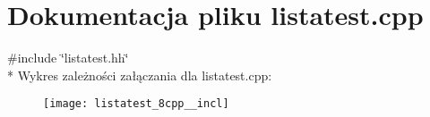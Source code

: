 \section{Dokumentacja pliku listatest.\+cpp}
\label{listatest_8cpp}
{\ttfamily \#include \char`\"{}listatest.\+hh\char`\"{}}\\*
Wykres zależności załączania dla listatest.\+cpp\+:\nopagebreak
\begin{figure}[H]
\begin{center}
\leavevmode
\texttt{[image: listatest\_8cpp\_\_incl]}
\end{center}
\end{figure}

